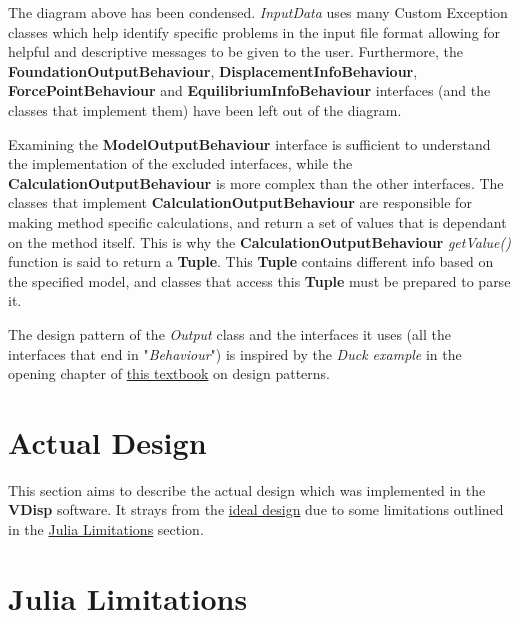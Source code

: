 \documentclass[11pt,fleqn]{article}
\newcommand{\indentpar}{\phantom{=}}
\begin{document}
    \indentpar The diagram above has been condensed. \emph{InputData} uses many 
    Custom Exception classes which help identify specific problems in the input file
    format allowing for helpful and descriptive messages to be given to the user. Furthermore,
    the \textbf{FoundationOutputBehaviour}, \textbf{DisplacementInfoBehaviour}, \textbf{ForcePointBehaviour} and
    \textbf{EquilibriumInfoBehaviour} interfaces (and the classes that implement them) have 
    been left out of the diagram. 
    
    \indentpar Examining the \textbf{ModelOutputBehaviour} interface is sufficient
    to understand the implementation of the excluded interfaces, while the \textbf{CalculationOutputBehaviour}
    is more complex than the other interfaces. The classes that implement \textbf{CalculationOutputBehaviour}
    are responsible for making method specific calculations, and return a set of values that is dependant on 
    the method itself. This is why the \textbf{CalculationOutputBehaviour} \emph{getValue()} function is said to
    return a \textbf{Tuple}. This \textbf{Tuple} contains different info based on the specified model, and classes
    that access this \textbf{Tuple} must be prepared to parse it.

    \indentpar The design pattern of the \emph{Output} class and the interfaces it uses (all the interfaces that 
    end in "\emph{Behaviour}") is inspired by the \emph{Duck example} in the opening chapter of \href{https://github.com/ksatria/MK-Design-Pattern/blob/master/Ebook/Head%20First%20Design%20Patterns.pdf}{this textbook}
    on design patterns.
    
    \section*{Actual Design} \label{actualDesign}

    \indentpar This section aims to describe the actual design which was implemented
    in the \textbf{VDisp} software. It strays from the \hyperref[initialDesign]{ideal design} due
    to some limitations outlined in the \hyperref[juliaLimits]{Julia Limitations} section.\\
    
    \section*{Julia Limitations} \label{juliaLimits}
\end{document}
